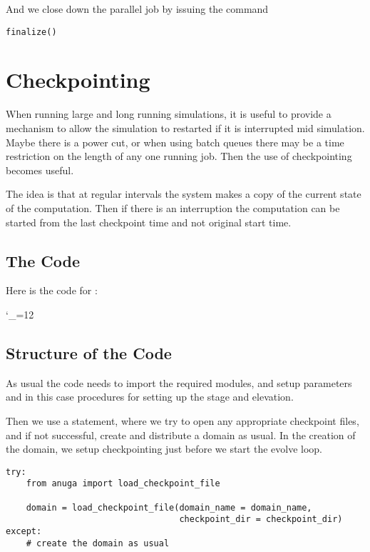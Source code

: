 \documentclass{manual}
\newcommand{\verbatiminputB}[1]{%
\endgroup}
\def\verbatiminputunderscore{\begingroup
\catcode`\_=12
\verbatiminputB}
\begin{document}
And we close down the parallel job by issuing the command

\begin{verbatim}
finalize()
\end{verbatim}


\chapter{Checkpointing}

When running large and long running simulations, it is useful to provide a mechanism to allow the simulation to restarted if it is interrupted mid simulation. Maybe there is a power cut, or when using batch queues there may be a time restriction on the length of any one running job. Then the use of checkpointing becomes useful.

The idea is that at regular intervals the system makes a copy of the current state of the computation. Then if there is an interruption the computation can be started from the last checkpoint time and not original start time.

\section{The Code}

Here is the code for :

\verbatiminputunderscore{../../anuga_core/examples/checkpointing/runCheckpoint.py}

\section{Structure of the Code}

As usual the code needs to import the required modules, and setup parameters and in this case procedures for setting up the stage and elevation.

Then we use a  statement, where we try to open any appropriate checkpoint files, and if not successful, create and distribute a domain as usual. In the creation of the domain, we setup checkpointing just before we start the evolve loop.


\begin{verbatim}
try:
    from anuga import load_checkpoint_file

    domain = load_checkpoint_file(domain_name = domain_name,
                                  checkpoint_dir = checkpoint_dir)
except:
    # create the domain as usual
\end{verbatim}
\end{document}

